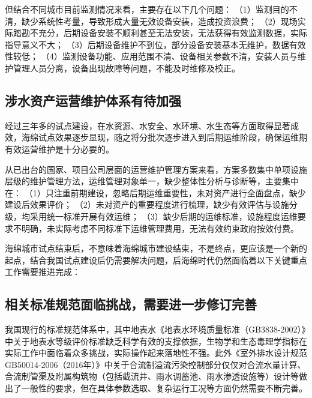 \documentclass[
]{book}
\begin{document}
但结合不同城市目前监测情况来看，主要存在以下几个问题：
（1）监测目的不清，缺少系统性考量，导致形成大量无效设备安装，造成投资浪费；
（2）现场实际踏勘不充分，后期设备安装不顺利甚至无法安装，无法获得有效监测数据，实际指导意义不大；
（3）后期设备维护不到位，部分设备安装基本无维护，数据有效性较低；
（4）监测设备功能、应用范围不清、设备相关参数不清，安装人员与维护管理人员分离，设备出现故障等问题，不能及时维修及校正。

\hypertarget{ux6d89ux6c34ux8d44ux4ea7ux8fd0ux8425ux7ef4ux62a4ux4f53ux7cfbux6709ux5f85ux52a0ux5f3a}{%
\subsection{涉水资产运营维护体系有待加强}\label{ux6d89ux6c34ux8d44ux4ea7ux8fd0ux8425ux7ef4ux62a4ux4f53ux7cfbux6709ux5f85ux52a0ux5f3a}}

经过三年多的试点建设，在水资源、水安全、水环境、水生态等方面取得显著成效，海绵试点效果逐步显现，随之将分批次逐步进入到后期运维阶段，确保运维期有效运营维护是十分必要的。

从已出台的国家、项目公司层面的运营维护管理方案来看，方案多数集中单项设施层级的维护管理方法，运维管理对象单一，缺少整体性分析与诊断等，主要集中在：
（1）只注重前期建设，忽略后期运维重要性，未对资产进行全面盘点，缺少建设后效果评价；
（2）未对资产的重要程度进行梳理，缺少有效评估与设施分级，均采用统一标准开展有效运维；
（3）缺少后期的运维标准，设施程度运维要求不明确，未实际考虑不同标准下运维管理费用，无法有效约束政府按效付费。

海绵城市试点结束后，不意味着海绵城市建设结束，不是终点，更应该是一个新的起点，结合我国试点建设后仍需要解决问题，后海绵时代仍然面临着以下关键重点工作需要推进完成：

\hypertarget{ux76f8ux5173ux6807ux51c6ux89c4ux8303ux9762ux4e34ux6311ux6218ux9700ux8981ux8fdbux4e00ux6b65ux4feeux8ba2ux5b8cux5584}{%
\subsection{相关标准规范面临挑战，需要进一步修订完善}\label{ux76f8ux5173ux6807ux51c6ux89c4ux8303ux9762ux4e34ux6311ux6218ux9700ux8981ux8fdbux4e00ux6b65ux4feeux8ba2ux5b8cux5584}}

我国现行的标准规范体系中，其中地表水《地表水环境质量标准（GB3838-2002）》中关于地表水等级评价标准缺乏科学有效的支撑依据，生物学和生态毒理学指标在实际工作中面临着众多挑战，实际操作起来落地性不强。此外《室外排水设计规范GB50014-2006（2016年）》中关于合流制溢流污染控制部分仅仅对合流水量计算、合流制管渠及附属构筑物（包括截流井、雨水调蓄池、雨水渗透设施等）设计等做出了一般性的要求，但在具体参数选取、复杂运行工况等方面仍然需要不断完善。
\end{document}
